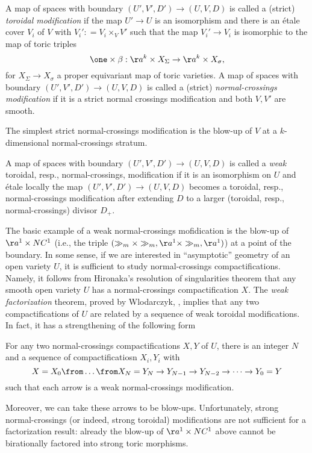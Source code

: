 \documentclass{article}
\begin{document}
\begin{defi}
  A map of spaces with boundary $(U', V', D')\to (U, V, D)$ is called a (strict) \emph{toroidal modification} if the map $U'\to U$ is an isomorphism and there is an \'etale cover $V_i$ of $V$ with $V_i': = V_i\times_V V'$ such that the map $V_i'\to V_i$ is isomorphic to the map of toric triples $$\one\times \beta:\aa^k\times X_\Sigma\to \aa^k\times X_\sigma,$$ for $X_\Sigma\to X_\sigma$ a proper equivariant map of toric varieties. 
A map of spaces with boundary $(U', V', D')\to (U, V, D)$ is called a (strict) \emph{normal-crossings modification} if it is a strict normal crossings modification and both $V, V'$ are smooth. 
\end{defi}
The simplest strict normal-crossings modification is the blow-up of $V$ at a $k$-dimensional normal-crossings stratum.
\begin{defi}
  A map of spaces with boundary $(U', V', D')\to (U, V, D)$ is called a \emph{weak} toroidal, resp., normal-crossings, modification if it is an isomorphism on $U$ and \'etale locally the map $(U', V', D')\to (U, V, D)$ becomes a toroidal, resp., normal-crossings modification after extending $D$ to a larger (toroidal, resp., normal-crossings) divisor $D_+$. 
\end{defi}
The basic example of a weak normal-crossings mofidication is the blow-up of $\aa^1\times NC^1$ (i.e., the triple $(\gg_m\times \gg_m, \aa^1\times \gg_m, \aa^1)$) at a point of the boundary. In some sense, if we are interested in ``asymptotic'' geometry of an open variety $U$, it is sufficient to study normal-crossings compactifications. Namely, it follows from Hironaka's resolution of singularities theorem \cite{hironaka} that any smooth open variety $U$ has a normal-crossings compactification $X$. The \emph{weak factorization} theorem, proved by Wlodarczyk, \cite{wlodarczyk}, implies that any two compactifications of $U$ are related by a sequence of weak toroidal modifications. In fact, it has a strengthening of the following form
\begin{thm}
  For any two normal-crossings compactifications $X, Y$ of $U$, there is an integer $N$ and a sequence of compactificatiosn $X_i, Y_i$ with $$X = X_0\from \dots \from X_N = Y_N\to Y_{N-1}\to Y_{N-2}\to \dots\to Y_0 = Y$$ such that each arrow is a weak normal-crossings modification.
\end{thm}
Moreover, we can take these arrows to be blow-ups. Unfortunately, strong normal-crossings (or indeed, strong toroidal) modifications are not sufficient for a factorization result: already the blow-up of $\aa^1\times NC^1$ above cannot be birationally factored into strong toric morphisms. 
\end{document}
